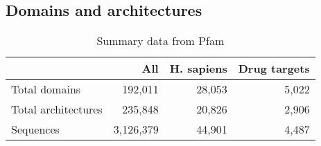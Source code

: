 	

\subsection{Domains and architectures}

\begin{table}
	\begin{center}
		\sf
		\begin{tabular}{l r r r}
			& \textbf{All} & \textbf{H. sapiens} & \textbf{Drug targets}			\\
			\hline
			Total domains & 192,011 & 28,053 & 5,022						\\
			Total architectures & 235,848 & 20,826 & 2,906					\\	
			Sequences & 3,126,379 & 44,901 & 4,487							\\
			\hline
		\end{tabular}
		\caption{Summary data from Pfam}
	\end{center}
\end{table}

